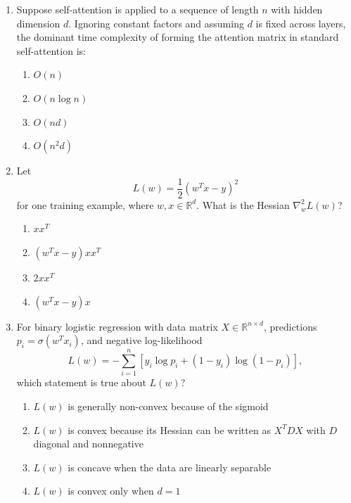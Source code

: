 \documentclass[11pt]{article}
\newcommand{\cmark}{\ding{51}}
\begin{document}
\begin{enumerate}[leftmargin=*]
\begin{enumerate}[label=\Alph*.]
    \item It guarantees fewer parameters than single-head attention
    \item It allows the model to attend to different types of relationships or positions simultaneously \cmark
    \item It removes the need for positional encodings
    \item It makes the attention computation linear in sequence length
\end{enumerate}

\item Suppose self-attention is applied to a sequence of length $n$ with hidden dimension $d$. Ignoring constant factors and assuming $d$ is fixed across layers, the dominant time complexity of forming the attention matrix in standard self-attention is:

\begin{enumerate}[label=\Alph*.]
    \item $O(n)$
    \item $O(n \log n)$
    \item $O(n d)$
    \item $O(n^2 d)$ \cmark
\end{enumerate}

\item Let
\[
L(w)=\frac{1}{2}(w^T x-y)^2
\]
for one training example, where $w,x\in\mathbb{R}^d$. What is the Hessian $\nabla^2_w L(w)$?

\begin{enumerate}[label=\Alph*.]
    \item $xx^T$ \cmark
    \item $(w^Tx-y)xx^T$
    \item $2xx^T$
    \item $(w^Tx-y)x$
\end{enumerate}

\item For binary logistic regression with data matrix $X\in\mathbb{R}^{n\times d}$, predictions $p_i=\sigma(w^T x_i)$, and negative log-likelihood
\[
L(w)=-\sum_{i=1}^n \left[y_i\log p_i+(1-y_i)\log(1-p_i)\right],
\]
which statement is true about $L(w)$?

\begin{enumerate}[label=\Alph*.]
    \item $L(w)$ is generally non-convex because of the sigmoid
    \item $L(w)$ is convex because its Hessian can be written as $X^T D X$ with $D$ diagonal and nonnegative \cmark
    \item $L(w)$ is concave when the data are linearly separable
    \item $L(w)$ is convex only when $d=1$
\end{enumerate}


\end{enumerate}
\end{document}
